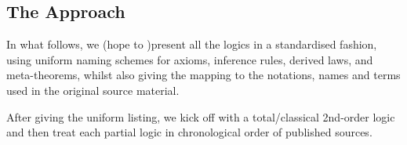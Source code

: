 \subsection{The Approach}

In what follows, we (hope to )present all the logics in a
standardised fashion, using uniform naming schemes for axioms,
inference rules, derived laws, and meta-theorems, whilst also
giving the mapping to the notations, names and terms used in
the original source material.

After giving the uniform listing,
we kick off with a total/classical 2nd-order logic
and then treat each partial logic
in chronological order of published sources.
